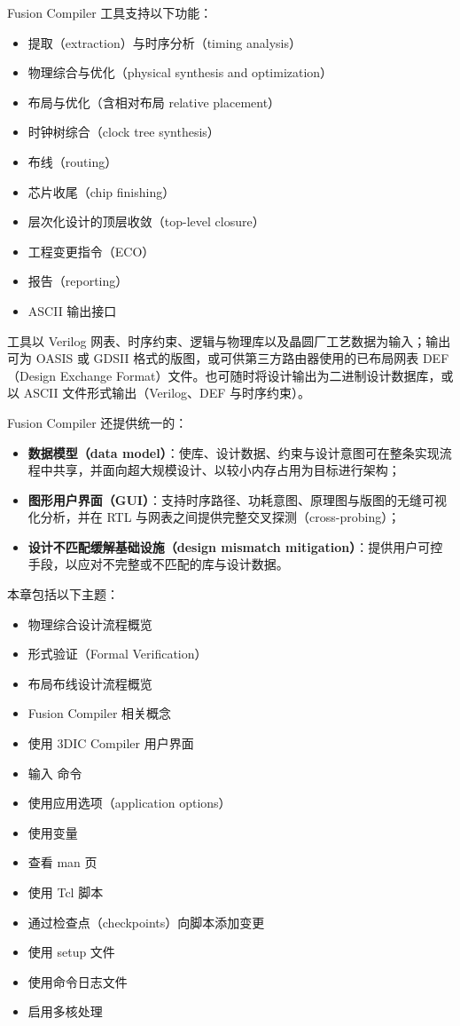 \label{chap:fc}

Fusion Compiler 工具支持以下功能：
\begin{itemize}
  \item 提取（extraction）与时序分析（timing analysis）
  \item 物理综合与优化（physical synthesis and optimization）
  \item 布局与优化（含相对布局 relative placement）
  \item 时钟树综合（clock tree synthesis）
  \item 布线（routing）
  \item 芯片收尾（chip finishing）
  \item 层次化设计的顶层收敛（top-level closure）
  \item 工程变更指令（ECO）
  \item 报告（reporting）
  \item ASCII 输出接口
\end{itemize}

工具以 Verilog 网表、时序约束、逻辑与物理库以及晶圆厂工艺数据为输入；输出可为 OASIS 或 GDSII 格式的版图，或可供第三方路由器使用的已布局网表 DEF（Design Exchange Format）文件。也可随时将设计输出为二进制设计数据库，或以 ASCII 文件形式输出（Verilog、DEF 与时序约束）。

Fusion Compiler 还提供统一的：
\begin{itemize}
  \item \textbf{数据模型（data model）}：使库、设计数据、约束与设计意图可在整条实现流程中共享，并面向超大规模设计、以较小内存占用为目标进行架构；
  \item \textbf{图形用户界面（GUI）}：支持时序路径、功耗意图、原理图与版图的无缝可视化分析，并在 RTL 与网表之间提供完整交叉探测（cross-probing）；
  \item \textbf{设计不匹配缓解基础设施（design mismatch mitigation）}：提供用户可控手段，以应对不完整或不匹配的库与设计数据。
\end{itemize}

本章包括以下主题：
\begin{itemize}
  \item 物理综合设计流程概览
  \item 形式验证（Formal Verification）
  \item 布局布线设计流程概览
  \item Fusion Compiler 相关概念
  \item 使用 3DIC Compiler 用户界面
  \item 输入  命令
  \item 使用应用选项（application options）
  \item 使用变量
  \item 查看 man 页
  \item 使用 Tcl 脚本
  \item 通过检查点（checkpoints）向脚本添加变更
  \item 使用 setup 文件
  \item 使用命令日志文件
  \item 启用多核处理
\end{itemize}

